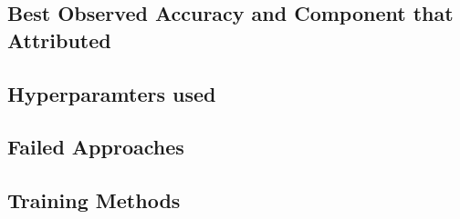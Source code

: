 \subsection{Best Observed Accuracy and Component that Attributed}\label{subsec:best-accuracy}

\subsection{Hyperparamters used}\label{subsec:hyperparameters}

\subsection{Failed Approaches}\label{subsec:failed-approaches}

\subsection{Training Methods}\label{subsec:training-methods}